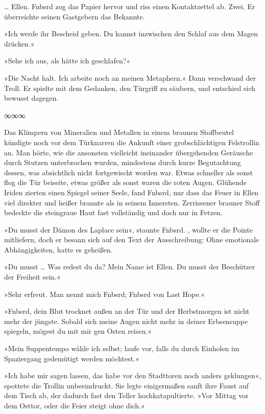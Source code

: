 … Ellen. Fnbsrd zog das Papier hervor und riss einen Kontaktzettel ab. Zwei. Er überreichte seinen Gastgebern das Bekannte.

»Ich werde ihr Bescheid geben. Du kannst inzwischen den Schlaf aus dem Magen drücken.«

»Sehe ich aus, als hätte ich geschlafen?«

»Die Nacht halt. Ich arbeite noch an meinen Metaphern.« Dann verschwand der Troll. Er spielte mit dem Gedanken, den Türgriff zu säubern, und entschied sich bewusst dagegen.

\begin{center}
∞∞∞
\end{center}

Das Klimpern von Mineralien und Metallen in einem braunen Stoffbeutel kündigte noch vor dem Türknarren die Ankunft einer grobschlächtigen Felstrollin an. Man hörte, wie die ansonsten vielleicht ineinander übergehenden Geräusche durch Stutzen unterbrochen wurden, mindestens durch kurze Begutachtung dessen, was absichtlich nicht fortgewischt worden war. Etwas schneller als sonst flog die Tür beiseite, etwas größer als sonst waren die roten Augen. Glühende Iriden zierten einen Spiegel seiner Seele, fand Fnbsrd, nur dass das Feuer in Ellen viel direkter und heißer brannte als in seinem Innersten. Zerrissener brauner Stoff bedeckte die steingraue Haut fast vollständig und doch nur in Fetzen.

»Du musst der Dämon des Laplace sein«, staunte Fnbsrd. , wollte er die Pointe mitliefern, doch er besann sich auf den Text der Ausschreibung: Ohne emotionale Abhängigkeiten, hatte es geheißen.

»Du musst … Was redest du da? Mein Name ist Ellen. Du musst der Beschützer der Freiheit sein.«

»Sehr erfreut. Man nennt mich Fnbsrd; Fnbsrd von Last Hope.«

»Fnbsrd, dein Blut trocknet außen an der Tür und der Herbstmorgen ist nicht mehr der jüngste. Sobald sich meine Augen nicht mehr in deiner Erbsensuppe spiegeln, mögest du mit mir gen Osten reisen.«

 »Mein Suppentempo wähle ich selbst; laufe vor, falls du durch Einholen im Spaziergang gedemütigt werden möchtest.«

»Ich habe mir sagen lassen, das habe vor den Stadttoren noch anders geklungen«, spottete die Trollin unbeeindruckt. Sie legte einigermaßen sanft ihre Faust auf dem Tisch ab, der dadurch fast den Teller hochkatapultierte. »Vor Mittag vor dem Osttor, oder die Feier steigt ohne dich.«


